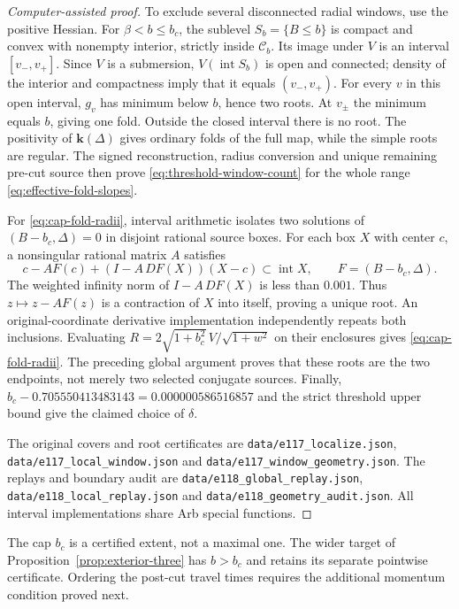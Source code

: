 \documentclass[11pt,a4paper]{article}
\theoremstyle{remark}\newtheorem{remark}[theorem]{Remark}
\begin{document}
\begin{proof}[Computer-assisted proof]
To exclude several disconnected radial windows, use the positive
Hessian. For $\beta<b\le b_c$, the sublevel
$S_b=\{B\le b\}$ is compact and convex with nonempty interior,
strictly inside $\mathcal C_b$. Its image under $V$ is an interval
$[v_-,v_+]$. Since $V$ is a submersion, $V(\operatorname{int}S_b)$
is open and connected; density of the interior and compactness imply
that it equals $(v_-,v_+)$. For every $v$ in this open interval,
$g_v$ has minimum below $b$, hence two roots. At $v_\pm$ the
minimum equals $b$, giving one fold. Outside the closed interval
there is no root. The positivity of $\mathbf k(\Delta)$ gives
ordinary folds of the full map, while the simple roots are regular.
The signed reconstruction, radius conversion and unique remaining
pre-cut source then prove \eqref{eq:threshold-window-count} for
the whole range \eqref{eq:effective-fold-slopes}.

For \eqref{eq:cap-fold-radii}, interval arithmetic isolates two
solutions of $(B-b_c,\Delta)=0$ in disjoint rational source boxes.
For each box $X$ with center $c$, a nonsingular rational matrix $A$
satisfies
\[
 c-AF(c)+(I-A\,DF(X))(X-c)\subset\operatorname{int}X,
 \qquad F=(B-b_c,\Delta).
\]
The weighted infinity norm of $I-A\,DF(X)$ is less than $0.001$.
Thus $z\mapsto z-AF(z)$ is a contraction of $X$ into itself,
proving a unique root. An original-coordinate derivative implementation
independently repeats both inclusions. Evaluating
$R=2\sqrt{1+b_c^2}\,V/\sqrt{1+w^2}$ on their enclosures gives
\eqref{eq:cap-fold-radii}. The preceding global argument proves
that these roots are the two endpoints, not merely two selected
conjugate sources. Finally,
$b_c-0.705550413483143=0.000000586516857$ and the strict
threshold upper bound give the claimed choice of $\delta$.

The original covers and root certificates are
\nolinkurl{data/e117_localize.json},
\nolinkurl{data/e117_local_window.json} and
\nolinkurl{data/e117_window_geometry.json}.
The replays and boundary audit are
\nolinkurl{data/e118_global_replay.json},
\nolinkurl{data/e118_local_replay.json} and
\nolinkurl{data/e118_geometry_audit.json}.
All interval implementations share Arb special functions.
\end{proof}

The cap $b_c$ is a certified extent, not a maximal one. The wider
target of Proposition~\ref{prop:exterior-three} has $b>b_c$ and
retains its separate pointwise certificate. Ordering the post-cut
travel times requires the additional momentum condition proved next.
\end{document}
